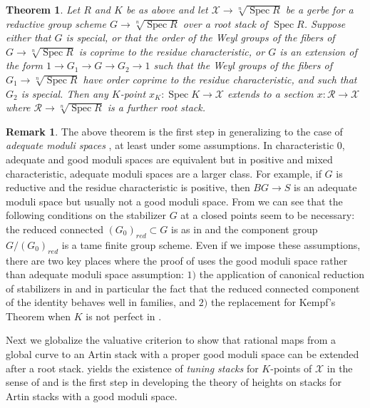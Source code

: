\documentclass{amsart}
\newtheorem{theorem}{Theorem}[section]
\theoremstyle{definition}
\newtheorem{remark}[remark]{Remark}
\newcommand{\cX}{\mathcal{X}}
\newcommand{\spec}{\operatorname{Spec}}
\begin{document}
\begin{theorem}\label{thm:main2} Let $R$ and $K$ be as above and let $\cX \to \sqrt[n]{\spec R}$ be a gerbe for a reductive group scheme $G \to \sqrt[n]{\spec R}$ over a root stack of $\spec R$. Suppose either that $G$ is special, or that the order of the Weyl groups of the fibers of $G\to \sqrt[n]{\spec R}$ is coprime to the residue characteristic, or $G$ is an extension of the form $1\to G_1\to G\to G_2\to 1$ such that the Weyl groups of the fibers of $G_1\to \sqrt[n]{\spec R}$ have order coprime to the residue characteristic, and such that $G_2$ is special. Then any $K$-point $x_K : \spec K \to \cX$ extends to a section $x : \mathcal{R} \to \cX$ where $\mathcal{R} \to \sqrt[n]{\spec R}$ is a further root stack. 
\end{theorem}

\begin{remark}
    The above theorem is the first step in generalizing  to the case of \emph{adequate moduli spaces} \cite{Alperadequate}, at least under some assumptions. In characteristic $0$, adequate and good moduli spaces are equivalent but in positive and mixed characteristic, adequate moduli spaces are a larger class. For example, if $G$ is reductive and the residue characteristic is positive, then $BG \to S$ is an adequate moduli space but usually not a good moduli space. From  we can see that the following conditions on the stabilizer $G$ at a closed points seem to be necessary: the reduced connected  $(G_0)_{red} \subset G$ is as in  and the component group $G/(G_0)_{red}$ is a tame finite group scheme. Even if we impose these assumptions, there are two key places where the proof of  uses the good moduli space rather than adequate moduli space assumption: $1)$ the application of canonical reduction of stabilizers \cite{ER} in  and in particular the fact that the reduced connected component of the identity behaves well in families, and $2)$ the replacement for Kempf's Theorem when $K$ is not perfect in .
\end{remark}

Next we globalize the valuative criterion to show that rational maps from a global curve to an Artin stack with a proper good moduli space can be extended after a root stack.  yields the existence of \emph{tuning stacks} for $K$-points of $\cX$ in the sense of \cite{ESZB} and is the first step in developing the theory of heights on stacks for Artin stacks with a good moduli space. 
\end{document}
